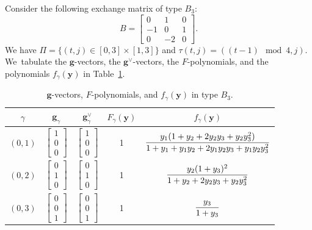 \documentclass[pdftex]{sigma}%
\def\y{{\mathbf y}}
\def\g{{\mathbf g}}
\numberwithin{equation}{section}
\begin{document}
\begin{Example}\label{ex:B3}
Consider the following exchange matrix of type $B_3$:
\[
B=\begin{bmatrix} 0&1&0 \\ -1&0&1 \\ 0&-2&0 \end{bmatrix}\!.
\]
We have $\Pi = \{(t,j) \in [0,3] \times [1,3]\}$ and $\tau(t,j) = ((t-1) \mod 4,j)$. We~tabulate the $\g$-vectors, the $\g^\vee$-vectors, the $F$-polynomials, and the polynomials $f_\gamma(\y)$ in Table~\ref{fig:B3}.
\begin{table}[t!]
\setlength{\tabcolsep}{2.0pt}
\renewcommand{\arraystretch}{1.2}
\caption{$\g$-vectors, $F$-polynomials, and $f_\gamma(\y)$ in type $B_3$.}
\label{fig:B3}
\begin{tabular}{c|c|c|c|c}
\hline
$\gamma$ & $\g_\gamma$ & $\g^\vee_\gamma$ & $F_\gamma(\y)$ & $f_\gamma(\y)$\\
\hline
$(0,1)$ & $\begin{bmatrix}1\\[-1ex]0\\[-1ex]0 \end{bmatrix}$& $\begin{bmatrix}1\\[-1ex]0\\[-1ex]0 \end{bmatrix}$& 1& $\dfrac{ y_1(1 + y_2 + 2y_2y_3 + y_2y_3^2)}{1 + y_1 + y_1y_2 + 2y_1y_2y_3 + y_1y_2y_3^2}\vphantom{\begin{bmatrix}1\\[-.5ex]0\\[-.5ex]0 \end{bmatrix}}$\\
\hline
$(0,2)$ & $\begin{bmatrix}0\\[-1ex]1\\[-1ex]0 \end{bmatrix}$ & $\begin{bmatrix}0\\[-1ex]1\\[-1ex]0 \end{bmatrix}$ & 1& $\dfrac{y_2(1+y_3)^2}{1 + y_2 + 2y_2y_3 + y_2y_3^2}\vphantom{\begin{bmatrix}1\\[-.5ex]0\\[-.5ex]0 \end{bmatrix}}$\\
\hline
$(0,3)$ & $\begin{bmatrix}0\\[-1ex]0\\[-1ex]1 \end{bmatrix}$ & $\begin{bmatrix}0\\[-1ex]0\\[-1ex]1 \end{bmatrix}$ & 1 & $\dfrac{y_3}{1+y_3}\vphantom{\begin{bmatrix}1\\[-.5ex]0\\[-.5ex]0 \end{bmatrix}}$\\

\end{tabular}
\end{table}
\end{Example}
\end{document}
